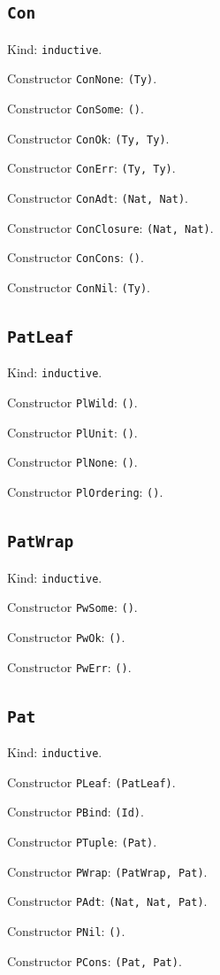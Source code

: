 \documentclass[11pt]{article}
\begin{document}
\subsection*{\texttt{Con}}
\noindent Kind: \texttt{inductive}.\par
\noindent Constructor \texttt{ConNone}: \texttt{(Ty)}.\par
\noindent Constructor \texttt{ConSome}: \texttt{()}.\par
\noindent Constructor \texttt{ConOk}: \texttt{(Ty, Ty)}.\par
\noindent Constructor \texttt{ConErr}: \texttt{(Ty, Ty)}.\par
\noindent Constructor \texttt{ConAdt}: \texttt{(Nat, Nat)}.\par
\noindent Constructor \texttt{ConClosure}: \texttt{(Nat, Nat)}.\par
\noindent Constructor \texttt{ConCons}: \texttt{()}.\par
\noindent Constructor \texttt{ConNil}: \texttt{(Ty)}.\par
\subsection*{\texttt{PatLeaf}}
\noindent Kind: \texttt{inductive}.\par
\noindent Constructor \texttt{PlWild}: \texttt{()}.\par
\noindent Constructor \texttt{PlUnit}: \texttt{()}.\par
\noindent Constructor \texttt{PlNone}: \texttt{()}.\par
\noindent Constructor \texttt{PlOrdering}: \texttt{()}.\par
\subsection*{\texttt{PatWrap}}
\noindent Kind: \texttt{inductive}.\par
\noindent Constructor \texttt{PwSome}: \texttt{()}.\par
\noindent Constructor \texttt{PwOk}: \texttt{()}.\par
\noindent Constructor \texttt{PwErr}: \texttt{()}.\par
\subsection*{\texttt{Pat}}
\noindent Kind: \texttt{inductive}.\par
\noindent Constructor \texttt{PLeaf}: \texttt{(PatLeaf)}.\par
\noindent Constructor \texttt{PBind}: \texttt{(Id)}.\par
\noindent Constructor \texttt{PTuple}: \texttt{(Pat)}.\par
\noindent Constructor \texttt{PWrap}: \texttt{(PatWrap, Pat)}.\par
\noindent Constructor \texttt{PAdt}: \texttt{(Nat, Nat, Pat)}.\par
\noindent Constructor \texttt{PNil}: \texttt{()}.\par
\noindent Constructor \texttt{PCons}: \texttt{(Pat, Pat)}.\par
\end{document}
